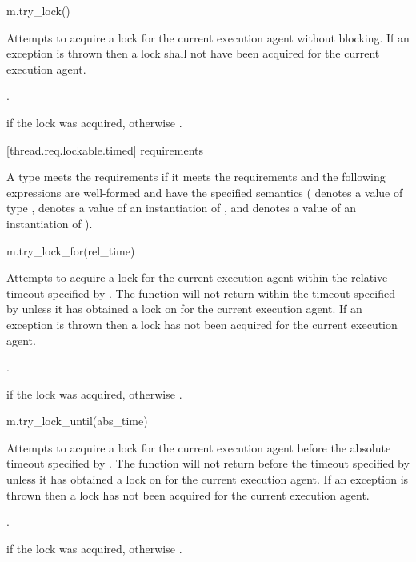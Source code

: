 \begin{itemdecl}
m.try_lock()
\end{itemdecl}

\begin{itemdescr}
\pnum
\effects
Attempts to acquire a lock for the current execution agent without blocking. If an
exception is thrown then a lock shall not have been acquired for the current execution agent.

\pnum
\returntype {}.

\pnum
\returns
{} if the lock was acquired, otherwise .
\end{itemdescr}

[thread.req.lockable.timed]{ requirements}

\pnum
A type  meets the  requirements if it meets the 
requirements and the following expressions are well-formed and have the specified semantics
( denotes a value of type ,  denotes a value of an
instantiation of , and  denotes a value
of an instantiation of ).

\begin{itemdecl}
m.try_lock_for(rel_time)
\end{itemdecl}

\begin{itemdescr}
\pnum
\effects
Attempts to acquire a lock for the current execution agent within the relative
timeout specified by . The function will not return
within the timeout specified by  unless it has obtained a lock on 
for the current execution agent. If an exception is thrown then a lock has not been
acquired for the current execution agent.

\pnum
\returntype {}.

\pnum
\returns
{} if the lock was acquired, otherwise .
\end{itemdescr}

\begin{itemdecl}
m.try_lock_until(abs_time)
\end{itemdecl}

\begin{itemdescr}
\pnum
\effects
Attempts to acquire a lock for the current execution agent before the absolute
timeout specified by . The function will not return
before the timeout specified by  unless it has obtained a lock on  for
the current execution agent. If an exception is thrown then a lock has not been acquired
for the current execution agent.

\pnum
\returntype {}.

\pnum
\returns
{} if the lock was acquired, otherwise .
\end{itemdescr}

